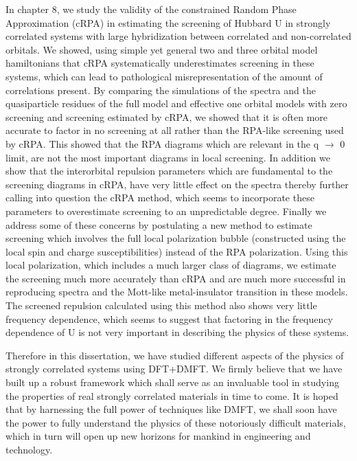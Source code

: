 \documentclass[10pt]{ruthesis}
\begin{document}
{In chapter 8, we study the validity of the constrained Random Phase Approximation (cRPA) in estimating the screening of Hubbard U in strongly correlated systems with large hybridization between correlated and non-correlated orbitals. We showed, using simple yet general two and three orbital model hamiltonians that cRPA systematically underestimates screening in these systems, which can lead to pathological misrepresentation of the amount of correlations present. By comparing the simulations of the spectra and the quasiparticle residues of the full model and effective one orbital models with zero screening and screening estimated by cRPA, we showed that it is often more accurate to factor in no screening at all rather than the RPA-like screening used by cRPA. This showed that the RPA diagrams which are relevant in the q $\rightarrow$ 0 limit, are not the most important diagrams in local screening. In addition we show that the interorbital repulsion parameters which are fundamental to the screening diagrams in cRPA, have very little effect on the spectra thereby further calling into question the cRPA method, which seems to incorporate these parameters to overestimate screening to an unpredictable degree. Finally we address some of these concerns by postulating a new method to estimate screening which involves the full local polarization bubble (constructed using the local spin and charge susceptibilities) instead of the RPA polarization. Using this local polarization, which includes a much larger class of diagrams, we estimate the screening much more accurately than cRPA and are much more successful in reproducing spectra and the Mott-like metal-insulator transition in these models. The screened repulsion calculated using this method also shows very little frequency dependence, which seems to suggest that factoring in the frequency dependence of U is not very important in describing the physics of these systems.

Therefore in this dissertation, we have studied different aspects of the physics of strongly correlated systems using DFT+DMFT. We firmly believe that we have built up a robust framework which shall serve as an invaluable tool in studying the properties of real strongly correlated materials in time to come. It is hoped that by harnessing the full power of techniques like DMFT, we shall soon have the power to fully understand the physics of these notoriously difficult materials, which in turn will open up new horizons for mankind in engineering and technology.
        

}
\end{document}
